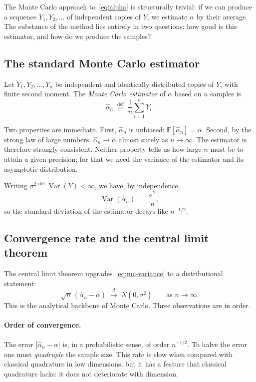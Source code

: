 \documentclass[11pt,a4paper]{article}
\theoremstyle{plain}
\theoremstyle{definition}
\theoremstyle{remark}
\newcommand{\E}{\mathbb{E}}
\newcommand{\Var}{\operatorname{Var}}
\newcommand{\eqdef}{\overset{\mathrm{def}}{=}}
\begin{document}
The Monte Carlo approach to~\eqref{eq:alpha} is structurally trivial: if
we can produce a sequence $Y_1, Y_2, \dots$ of independent copies of
$Y$, we estimate $\alpha$ by their average. The substance of the method
lies entirely in two questions: how good is this estimator, and how do
we produce the samples?

\subsection{The standard Monte Carlo estimator}

Let $Y_1, Y_2, \dots, Y_n$ be independent and identically distributed
copies of $Y$, with finite second moment. The \emph{Monte Carlo
estimator} of $\alpha$ based on $n$ samples is
\begin{equation}
\label{eq:mc-estimator}
\hat{\alpha}_n \;\eqdef\; \frac{1}{n}\sum_{i=1}^{n} Y_i.
\end{equation}

Two properties are immediate. First, $\hat{\alpha}_n$ is unbiased:
$\E[\hat{\alpha}_n] = \alpha$. Second, by the strong law of large
numbers, $\hat{\alpha}_n \to \alpha$ almost surely as $n \to \infty$.
The estimator is therefore strongly consistent. Neither property tells
us how large $n$ must be to attain a given precision; for that we need
the variance of the estimator and its asymptotic distribution.

Writing $\sigma^2 \eqdef \Var(Y) < \infty$, we have, by independence,
\begin{equation}
\label{eq:mc-variance}
\Var(\hat{\alpha}_n) \;=\; \frac{\sigma^2}{n},
\end{equation}
so the standard deviation of the estimator decays like $n^{-1/2}$.

\subsection{Convergence rate and the central limit theorem}
\label{sec:clt}

The central limit theorem upgrades~\eqref{eq:mc-variance} to a
distributional statement:
\begin{equation}
\label{eq:clt}
\sqrt{n}\,(\hat{\alpha}_n - \alpha) \;\xrightarrow{\;d\;}\;
N(0, \sigma^2) \qquad \text{as } n \to \infty.
\end{equation}
This is the analytical backbone of Monte Carlo. Three observations are
in order.

\paragraph{Order of convergence.} The error
$|\hat{\alpha}_n - \alpha|$ is, in a probabilistic sense, of order
$n^{-1/2}$. To halve the error one must \emph{quadruple} the sample
size. This rate is slow when compared with classical quadrature in low
dimensions, but it has a feature that classical quadrature lacks: it
does not deteriorate with dimension.
\end{document}

